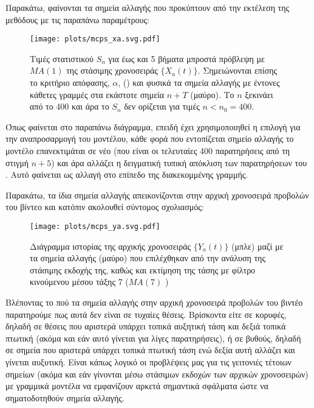 \par Παρακάτω, φαίνονται τα σημεία αλλαγής που προκύπτουν από την εκτέλεση της μεθόδους με τις παραπάνω παραμέτρους:

\begin{figure}[H]
    \begin{center}
        \texttt{[image: plots/mcps\_xa.svg.pdf]}
        \caption{Τιμές στατιστικού $S_n$ για έως και 5 βήματα μπροστά πρόβλεψη με $MA(1)$ της στάσιμης χρονοσειράς $\{X_a(t)\}$. Σημειώνονται επίσης το κριτήριο απόφασης, $\alpha$, () και φυσικά τα σημεία αλλαγής με έντονες κάθετες γραμμές στα εκάστοτε σημεία $n+T$ (μαύρο). Το $n$ ξεκινάει από το 400 και άρα το $S_n$ δεν ορίζεται για τιμές $n<n_0=400$.}
        \label{fig:mcps_xa}
    \end{center}
\end{figure}

Όπως φαίνεται στο παραπάνω διάγραμμα, επειδή έχει χρησιμοποιηθεί η επιλογή  για την αναπροσαρμογή του μοντέλου, κάθε φορά που εντοπίζεται σημείο αλλαγής το μοντέλο επανεκτιμάται σε νέο  (που είναι οι τελευταίες 400 παρατηρήσεις από τη στιγμή $n+5$) και άρα αλλάζει η δειγματική τυπική απόκλιση των παρατηρήσεων του . Αυτό φαίνεται ως αλλαγή στο επίπεδο της  διακεκομμένης γραμμής. 

\par Παρακάτω, τα ίδια σημεία αλλαγής απεικονίζονται στην αρχική χρονοσειρά προβολών του βίντεο  και κατόπιν ακολουθεί σύντομος σχολιασμός:

\begin{figure}[H]
    \begin{center}
        \texttt{[image: plots/mcps\_ya.svg.pdf]}
        \caption{Διάγραμμα ιστορίας της αρχικής χρονοσειράς $\{Y_a(t)\}$ (μπλε) μαζί με τα σημεία αλλαγής (μαύρο) που επιλέχθηκαν από την ανάλυση της στάσιμης εκδοχής της, καθώς και εκτίμηση της τάσης με φίλτρο κινούμενου μέσου τάξης 7 ($MA(7)$ )}
        \label{fig:mcps_ya}
    \end{center}
\end{figure}

Βλέποντας το πού  τα σημεία αλλαγής στην αρχική χρονοσειρά προβολών του βιντέο  παρατηρούμε πως αυτά δεν είναι σε τυχαίες θέσεις. Βρίσκοντα είτε σε κορυφές, δηλαδή σε θέσεις που αριστερά υπάρχει τοπικά αυξητική τάση και δεξιά τοπικά πτωτική (ακόμα και εάν αυτό γίνεται για λίγες παρατηρήσεις), ή σε βυθούς, δηλαδή σε σημεία που αριστερά υπάρχει τοπικά πτωτική τάση ενώ δεξία αυτή αλλάζει και γίνεται αυξυτική. Είναι κάπως λογικό οι προβλέψεις μας για τις γειτονιές τέτοιων σημείων (ακόμα και εάν γίνονται μέσω στάσιμων εκδοχών των αρχικών χρονοσειρών) με γραμμικά μοντέλα να εμφανίζουν αρκετά σημαντικά σφάλματα ώστε να σηματοδοτηθούν σημεία αλλαγής.


